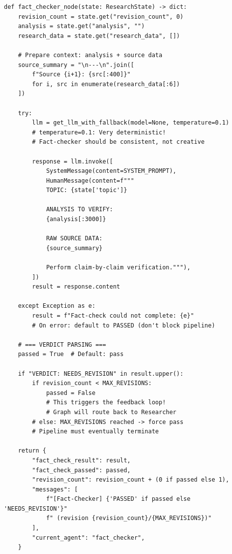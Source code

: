 \documentclass[11pt,a4paper,twoside]{report}
\begin{document}
\begin{lstlisting}[style=pythonstyle,caption={fact\_checker.py --- Decision Logic}]
def fact_checker_node(state: ResearchState) -> dict:
    revision_count = state.get("revision_count", 0)
    analysis = state.get("analysis", "")
    research_data = state.get("research_data", [])

    # Prepare context: analysis + source data
    source_summary = "\n---\n".join([
        f"Source {i+1}: {src[:400]}"
        for i, src in enumerate(research_data[:6])
    ])

    try:
        llm = get_llm_with_fallback(model=None, temperature=0.1)
        # temperature=0.1: Very deterministic!
        # Fact-checker should be consistent, not creative

        response = llm.invoke([
            SystemMessage(content=SYSTEM_PROMPT),
            HumanMessage(content=f"""
            TOPIC: {state['topic']}

            ANALYSIS TO VERIFY:
            {analysis[:3000]}

            RAW SOURCE DATA:
            {source_summary}

            Perform claim-by-claim verification."""),
        ])
        result = response.content

    except Exception as e:
        result = f"Fact-check could not complete: {e}"
        # On error: default to PASSED (don't block pipeline)

    # === VERDICT PARSING ===
    passed = True  # Default: pass

    if "VERDICT: NEEDS_REVISION" in result.upper():
        if revision_count < MAX_REVISIONS:
            passed = False
            # This triggers the feedback loop!
            # Graph will route back to Researcher
        # else: MAX_REVISIONS reached -> force pass
        # Pipeline must eventually terminate

    return {
        "fact_check_result": result,
        "fact_check_passed": passed,
        "revision_count": revision_count + (0 if passed else 1),
        "messages": [
            f"[Fact-Checker] {'PASSED' if passed else 'NEEDS_REVISION'}"
            f" (revision {revision_count}/{MAX_REVISIONS})"
        ],
        "current_agent": "fact_checker",
    }
\end{lstlisting}
\end{document}
